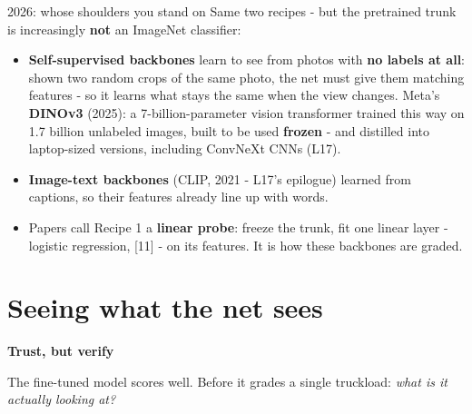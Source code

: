 \documentclass[aspectratio=169]{beamer}
\begin{document}
\begin{frame}{2026: whose shoulders you stand on}
  Same two recipes - but the pretrained trunk is increasingly \textbf{not} an ImageNet
  classifier:
  \vskip 4pt
  \begin{itemize}\small
    \item \textbf{Self-supervised backbones} learn to see from photos with \textbf{no
      labels at all}: shown two random crops of the same photo, the net must give them
      matching features - so it learns what stays the same when the view changes.
      Meta's \textbf{DINOv3} (2025): a 7-billion-parameter vision transformer trained
      this way on 1.7 billion unlabeled images, built to be used \textbf{frozen} - and
      distilled into laptop-sized versions, including ConvNeXt CNNs (L17).
    \item \textbf{Image-text backbones} (CLIP, 2021 - L17's epilogue) learned from
      captions, so their features already line up with words.
    \item Papers call Recipe 1 a \textbf{linear probe}: freeze the trunk, fit one linear
      layer - logistic regression, [11] - on its features. It is how these backbones are
      graded.
  \end{itemize}
  \vskip 6pt
\end{frame}

\section{Seeing what the net sees}

\begin{frame}[plain]
  \vfill
  \begin{center}
    {\Large\color{popblue}\textbf{Trust, but verify}}\\[0.9em]
    \begin{minipage}{0.82\textwidth}\centering\small
      The fine-tuned model scores well. Before it grades a single truckload: \emph{what
      is it actually looking at?}
    \end{minipage}
  \end{center}
  \vfill
\end{frame}
\end{document}
